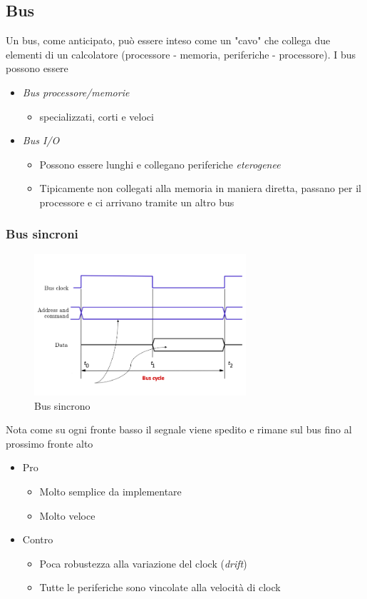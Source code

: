 \subsection{Bus}
Un bus, come anticipato, può essere inteso come un "cavo" che collega due elementi di un calcolatore (processore - memoria, periferiche - processore). I bus possono essere
\begin{itemize}
	\item  \textit{Bus processore/memorie}
	      \begin{itemize}
		      \item specializzati, corti e veloci
	      \end{itemize}
	\item \textit{Bus I/O}
	      \begin{itemize}
		      \item Possono essere lunghi e collegano periferiche \textit{eterogenee}
		      \item Tipicamente non collegati alla memoria in maniera diretta, passano per il processore e ci arrivano tramite un altro bus
	      \end{itemize}
\end{itemize}
\subsubsection*{Bus sincroni}
\begin{figure}[H]
	\begin{center}
		\includegraphics[width = 0.7\textwidth]{Images/Bus sincrono.png}
	\end{center}
	\caption{Bus sincrono}
\end{figure}
Nota come su ogni fronte basso il segnale viene spedito e rimane sul bus fino al prossimo fronte alto
\begin{itemize}
	\item Pro
	      \begin{itemize}
		      \item Molto semplice da implementare
		      \item Molto veloce
	      \end{itemize}
	\item Contro
	      \begin{itemize}
		      \item Poca robustezza alla variazione del clock (\textit{drift})
		      \item Tutte le periferiche sono vincolate alla velocità di clock
	      \end{itemize}
\end{itemize}
